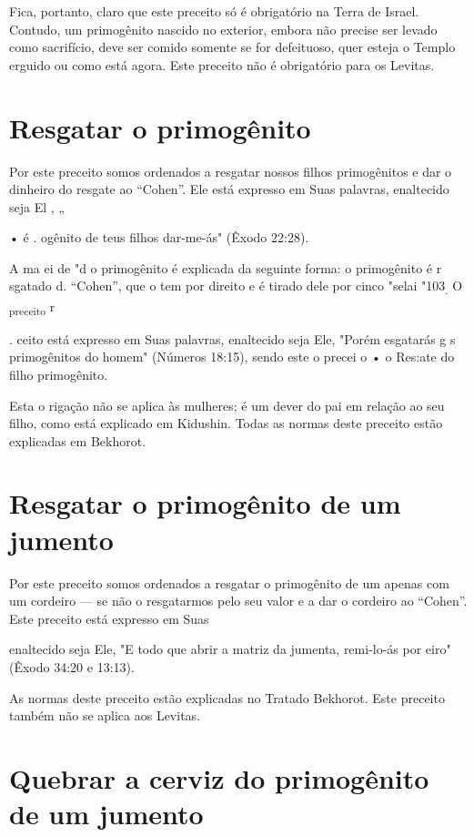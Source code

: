 Fica, portanto, claro que este preceito só é obrigatório na Terra de
Israel. Contudo, um primogênito nascido no exterior, embora não precise
ser levado como sacrifício, deve ser comido somente se for defeituoso,
quer esteja o Templo erguido ou como está agora. Este preceito não é
obrigatório para os Levitas.

\section{Resgatar o primogênito}

Por este preceito somos ordenados a resgatar nossos filhos primogê­nitos
e dar o dinheiro do resgate ao ``Cohen''. Ele está expresso em Suas
palavras, enaltecido seja El , „


• é . ogênito de teus filhos dar-me-ás" (Êxodo 22:28).


A ma ei de "d o primogênito é explicada da seguinte forma: o primogênito
é r sgatado d. ``Cohen'', que o tem por direito e é tirado dele por cinco
"selai "103\textsubscript{.} O \textsubscript{preceito} r

. ceito está expresso em Suas palavras, enaltecido seja Ele, "Porém
esgatarás g s primogênitos do homem" (Números 18:15), sen­do este o
precei o • o Res:ate do filho primogênito.

Esta o rigação não se aplica às mulheres; é um dever do pai em rela­ção
ao seu filho, como está explicado em Kidushin. Todas as normas deste
pre­ceito estão explicadas em Bekhorot.

\section{Resgatar o primogênito de um jumento}


Por este preceito somos ordenados a resgatar o primogênito de um apenas
com um cordeiro --- se não o resgatarmos pelo seu valor e a dar o
cordeiro ao ``Cohen''. Este preceito está expresso em Suas


enaltecido seja Ele, "E todo que abrir a matriz da jumenta, remi-lo-ás
por eiro" (Êxodo 34:20 e 13:13).

As normas deste preceito estão explicadas no Tratado Bekhorot. Es­te
preceito também não se aplica aos Levitas.

\section{Quebrar a cerviz do primogênito de um jumento}

